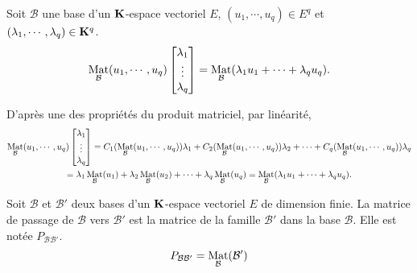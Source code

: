\begin{propn}
Soit $\mathcal B $ une base d'un $\mathbf{K}$-espace vectoriel $E$, $(u_1,\cdots,u_q)\in E^q$ et $(\lambda_1,\cdots,\lambda_q) \in \mathbf{K}^q$.
 \begin{displaymath}
  \mathop{\mathrm{Mat}}_\mathcal B(u_1,\cdots,u_q)
\begin{bmatrix}
  \lambda_1\\
  \vdots\\
 \lambda_q
\end{bmatrix} 
= \mathop{\mathrm{Mat}}_\mathcal B(\lambda_1u_1 + \cdots + \lambda_qu_q).
 \end{displaymath}
\end{propn}
\begin{demo}
 D'après une des propriétés du produit matriciel, par linéarité,
\begin{multline*}
   \mathop{\mathrm{Mat}}_\mathcal B(u_1,\cdots,u_q)
\begin{bmatrix}
  \lambda_1\\
  \vdots\\
 \lambda_q
\end{bmatrix} 
= C_1(\mathop{\mathrm{Mat}}_\mathcal B(u_1,\cdots,u_q))\lambda_1+C_2(\mathop{\mathrm{Mat}}_\mathcal B(u_1,\cdots,u_q))\lambda_2+\cdots+ C_q(\mathop{\mathrm{Mat}}_\mathcal B(u_1,\cdots,u_q))\lambda_q \\ 
= \lambda_1 \mathop{\mathrm{Mat}}_\mathcal B(u_1) + \lambda_2 \mathop{\mathrm{Mat}}_\mathcal B(u_2) + \cdots + \lambda_q \mathop{\mathrm{Mat}}_\mathcal B(u_q) 
= \mathop{\mathrm{Mat}}_\mathcal B(\lambda_1u_1 + \cdots + \lambda_qu_q).
\end{multline*}
\end{demo}
\begin{defi}
Soit $\mathcal B$ et $\mathcal B'$ deux bases d'un $\mathbf{K}$-espace vectoriel $E$ de dimension finie. La matrice de passage de  $\mathcal B$ vers $\mathcal B'$ est la matrice de la famille $\mathcal B'$ dans la base $\mathcal B$. Elle est notée $P_{\mathcal B \mathcal B'}$.
 \begin{displaymath}
  P_{\mathcal B \mathcal B'}= \mathop{\mathrm{Mat}}_\mathcal B (\mathcal B')
 \end{displaymath}
\end{defi}
